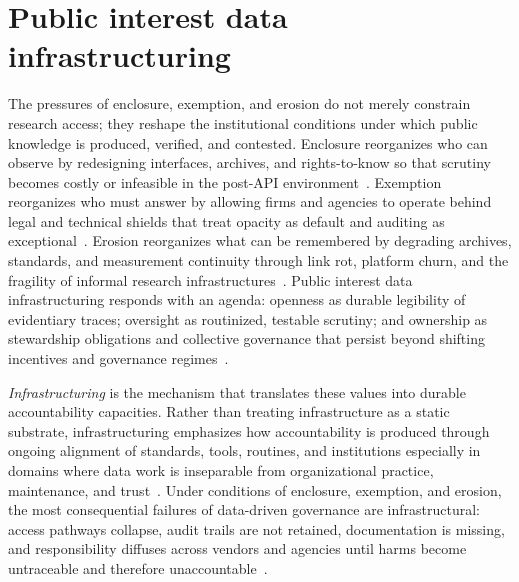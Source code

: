 \documentclass[acmsmall,screen]{acmart}
\begin{document}
\section*{Public interest data infrastructuring}
The pressures of enclosure, exemption, and erosion do not merely constrain research access; they reshape the institutional conditions under which public knowledge is produced, verified, and contested. Enclosure reorganizes who can observe by redesigning interfaces, archives, and rights-to-know so that scrutiny becomes costly or infeasible in the post-API environment~\cite{Freelon_ComputationalResearchPostAPI_2018,Bruns_APIcalypsesocialmedia_2019,Puschmann_endwildwest_2019}. Exemption reorganizes who must answer by allowing firms and agencies to operate behind legal and technical shields that treat opacity as default and auditing as exceptional~\cite{pasquale_black_2016,Halavais_Overcomingtermsservice_2019}. Erosion reorganizes what can be remembered by degrading archives, standards, and measurement continuity through link rot, platform churn, and the fragility of informal research infrastructures~\cite{gaffney_caveat_2018,baumgartner_incompleteness_2018}. Public interest data infrastructuring responds with an agenda: openness as durable legibility of evidentiary traces; oversight as routinized, testable scrutiny; and ownership as stewardship obligations and collective governance that persist beyond shifting incentives and governance regimes~\cite{vandervlist_APIGovernanceCase_2022}.

\textit{Infrastructuring} is the mechanism that translates these values into durable accountability capacities. Rather than treating infrastructure as a static substrate, infrastructuring emphasizes how accountability is produced through ongoing alignment of standards, tools, routines, and institutions especially in domains where data work is inseparable from organizational practice, maintenance, and trust~\cite{Plantin_Infrastructurestudiesmeet_2016,acker_DataCraftTheory_2019,passiTrustDataScience2018a}. Under conditions of enclosure, exemption, and erosion, the most consequential failures of data-driven governance are infrastructural: access pathways collapse, audit trails are not retained, documentation is missing, and responsibility diffuses across vendors and agencies until harms become untraceable and therefore unaccountable~\cite{passiTrustDataScience2018a}. 
\end{document}

